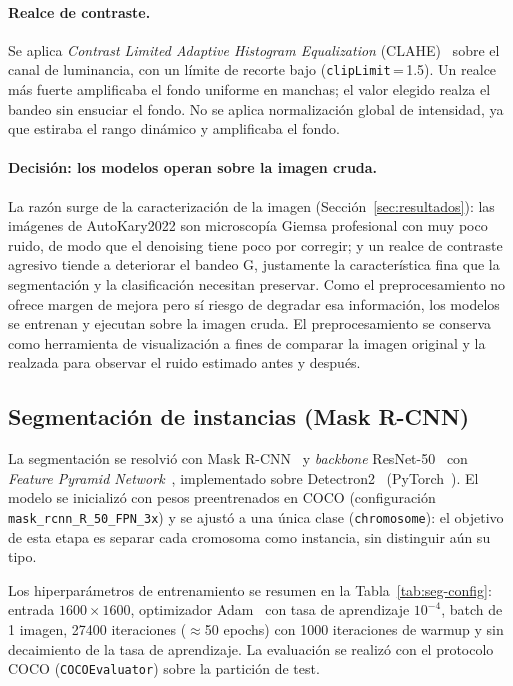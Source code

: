 \documentclass[11pt,a4paper]{article}
\begin{document}
\paragraph{Realce de contraste.} Se aplica \textit{Contrast Limited Adaptive
Histogram Equalization} (CLAHE)~\cite{zuiderveld1994clahe} sobre el canal de
luminancia, con un límite de recorte bajo (\texttt{clipLimit}\,=\,1.5). Un realce
más fuerte amplificaba el fondo uniforme en manchas; el valor elegido realza el
bandeo sin ensuciar el fondo. No se aplica normalización global de intensidad, ya
que estiraba el rango dinámico y amplificaba el fondo.

\paragraph{Decisión: los modelos operan sobre la imagen cruda.} La razón surge de la
caracterización de la imagen (Sección~\ref{sec:resultados}): las imágenes de
AutoKary2022 son microscopía Giemsa profesional con muy poco ruido, de modo que el
denoising tiene poco por corregir; y un realce de contraste agresivo tiende a
deteriorar el bandeo G, justamente la característica fina que la segmentación y la
clasificación necesitan preservar. Como el preprocesamiento no ofrece margen de
mejora pero sí riesgo de degradar esa información, los modelos se entrenan y ejecutan
sobre la imagen cruda. El preprocesamiento se conserva como herramienta de visualización a fines de comparar la
imagen original y la realzada para observar el ruido estimado antes y después.

\subsection{Segmentación de instancias (Mask R-CNN)}
\label{sec:segmentacion}

La segmentación se resolvió con Mask R-CNN~\cite{he2017maskrcnn} y \textit{backbone}
ResNet-50~\cite{he2016resnet} con \textit{Feature Pyramid
Network}~\cite{lin2017fpn}, implementado sobre Detectron2~\cite{wu2019detectron2}
(PyTorch~\cite{paszke2019pytorch}). El modelo se inicializó con pesos preentrenados
en COCO (configuración \texttt{mask\_rcnn\_R\_50\_FPN\_3x}) y se ajustó a una única
clase (\texttt{chromosome}): el objetivo de esta etapa es separar cada
cromosoma como instancia, sin distinguir aún su tipo.

Los hiperparámetros de entrenamiento se resumen en la Tabla~\ref{tab:seg-config}:
entrada \(1600\times1600\), optimizador Adam~\cite{kingma2015adam} con tasa de
aprendizaje \(10^{-4}\), batch de 1 imagen, 27400 iteraciones (\(\approx\)50
epochs) con 1000 iteraciones de warmup y sin decaimiento de la tasa
de aprendizaje. La evaluación se realizó con el protocolo COCO
(\texttt{COCOEvaluator}) sobre la partición de test.
\end{document}
